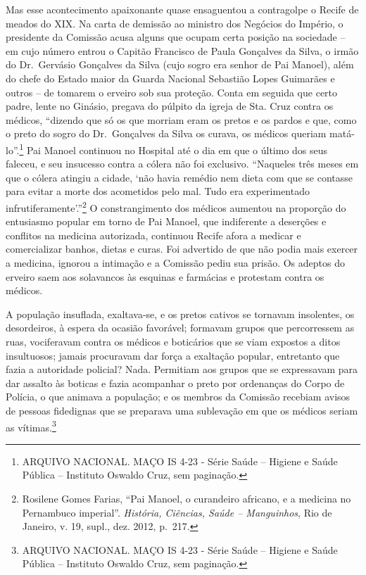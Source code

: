 Mas esse acontecimento apaixonante quase ensaguentou a contragolpe o
Recife de meados do XIX. Na carta de demissão ao ministro dos Negócios
do Império, o presidente da Comissão acusa alguns que ocupam certa
posição na sociedade -- em cujo número entrou o Capitão Francisco de
Paula Gonçalves da Silva, o irmão do Dr.~Gervásio Gonçalves da Silva
(cujo sogro era senhor de Pai Manoel), além do chefe do Estado maior da
Guarda Nacional Sebastião Lopes Guimarães e outros -- de tomarem o
erveiro sob sua proteção. Conta em seguida que certo padre, lente no
Ginásio, pregava do púlpito da igreja de Sta. Cruz contra os médicos,
``dizendo que só os que morriam eram os pretos e os pardos e que, como o
preto do sogro do Dr.~Gonçalves da Silva os curava, os médicos queriam
matá-lo''.\footnote{ARQUIVO NACIONAL. MAÇO IS 4-23 - Série Saúde --
  Higiene e Saúde Pública -- Instituto Oswaldo Cruz, sem paginação.} Pai
Manoel continuou no Hospital até o dia em que o último dos seus faleceu,
e seu insucesso contra a cólera não foi exclusivo. ``Naqueles três meses
em que o cólera atingiu a cidade, `não havia remédio nem dieta com que
se contasse para evitar a morte dos acometidos pelo mal. Tudo era
experimentado infrutiferamente'.''\footnote{Rosilene Gomes Farias, ``Pai
  Manoel, o curandeiro africano, e a medicina no Pernambuco imperial''.
  \emph{História, Ciências, Saúde -- Manguinhos}, Rio de Janeiro, v. 19,
  supl., dez. 2012, p.~217.} O constrangimento dos médicos aumentou na
proporção do entusiasmo popular em torno de Pai Manoel, que indiferente
a deserções e conflitos na medicina autorizada, continuou Recife afora a
medicar e comercializar banhos, dietas e curas. Foi advertido de que não
podia mais exercer a medicina, ignorou a intimação e a Comissão pediu
sua prisão. Os adeptos do erveiro saem aos solavancos às esquinas e
farmácias e protestam contra os médicos.

A população insuflada, exaltava-se, e os pretos cativos se tornavam
insolentes, os desordeiros, à espera da ocasião favorável; formavam
grupos que percorressem as ruas, vociferavam contra os médicos e
boticários que se viam expostos a ditos insultuosos; jamais procuravam
dar força a exaltação popular, entretanto que fazia a autoridade
policial? Nada. Permitiam aos grupos que se expressavam para dar assalto
às boticas e fazia acompanhar o preto por ordenanças do Corpo de
Polícia, o que animava a população; e os membros da Comissão recebiam
avisos de pessoas fidedignas que se preparava uma sublevação em que os
médicos seriam as vítimas.\footnote{ARQUIVO NACIONAL. MAÇO IS 4-23 -
  Série Saúde -- Higiene e Saúde Pública -- Instituto Oswaldo Cruz, sem
  paginação.}

